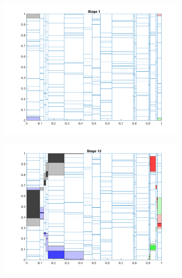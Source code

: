 \documentclass[letterpaper]{mandc2019}
\begin{document}
\begin{figure}[H]
  \centering
  \begin{subfigure}{0.49\textwidth}
  \includegraphics[scale=0.5]{figures/random_partition_1.png}
  \end{subfigure}
  \begin{subfigure}{0.49\textwidth}
  \includegraphics[scale=0.5]{figures/random_partition_2.png}
  \end{subfigure}
  \begin{subfigure}{0.49\textwidth}

\end{subfigure}
\end{figure}
\end{document}
